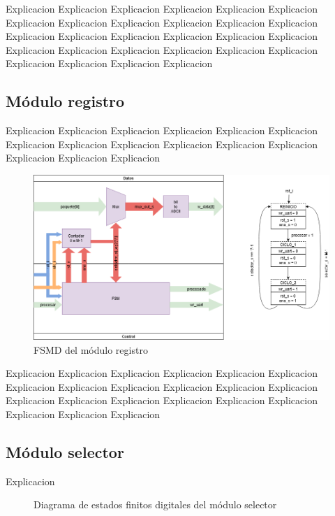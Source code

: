 		Explicacion Explicacion Explicacion Explicacion Explicacion Explicacion Explicacion Explicacion Explicacion Explicacion Explicacion Explicacion Explicacion Explicacion Explicacion Explicacion Explicacion Explicacion Explicacion Explicacion Explicacion Explicacion Explicacion Explicacion Explicacion Explicacion Explicacion Explicacion 
		
	\subsection{Módulo registro}
	
		Explicacion Explicacion Explicacion Explicacion Explicacion Explicacion Explicacion Explicacion Explicacion Explicacion Explicacion Explicacion Explicacion Explicacion Explicacion 
		
		\begin{figure}[h]
		\centering
			\includegraphics[scale=.4]{./Figures/FSMD-Registro}
			\caption{FSMD del módulo registro}
			\label{fig:FSMD_Registro}
		\end{figure}

		Explicacion Explicacion Explicacion Explicacion Explicacion Explicacion Explicacion Explicacion Explicacion Explicacion Explicacion Explicacion Explicacion Explicacion Explicacion Explicacion Explicacion Explicacion Explicacion Explicacion Explicacion 
		
	\subsection{Módulo selector}
	
		Explicacion 
		
		\begin{figure}[h]
		\centering
			\caption{Diagrama de estados finitos digitales del módulo selector}
			\label{fig:FSMD_Selector}
		\end{figure}
		
